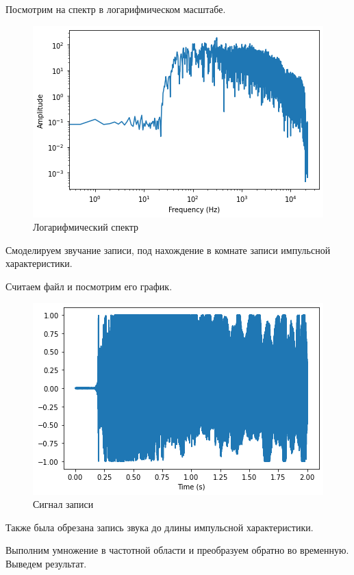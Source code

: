 \documentclass[a4paper, 14pt]{extarticle}
\begin{document}
    Посмотрим на спектр в логарифмическом масштабе.

    \begin{figure}[H]
        \centering
        \includegraphics[width=0.8\linewidth]{ir_spectrum_log}
        \caption{Логарифмический спектр}
        \label{fig:ir_spectrum_log}
    \end{figure}

    Смоделируем звучание записи, под нахождение в комнате записи импульсной характеристики.

    Считаем файл и посмотрим его график.

    \begin{figure}[H]
        \centering
        \includegraphics[width=0.8\linewidth]{scream_wave}
        \caption{Сигнал записи}
        \label{fig:scream_wave}
    \end{figure}

    Также была обрезана запись звука до длины импульсной характеристики.

    Выполним умножение в частотной области и преобразуем обратно во временную.
    Выведем результат.
\end{document}

